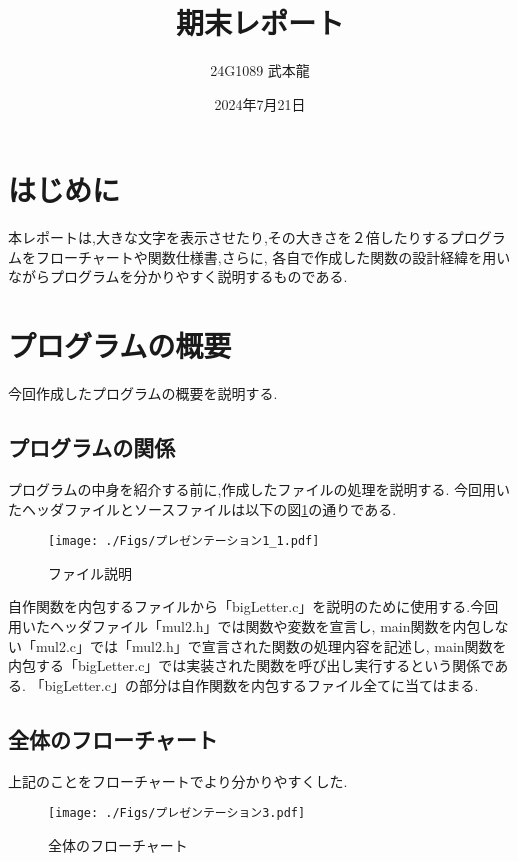 \documentclass[uplatex,dvipdfmx]{jsarticle}
\begin{document}
\title{期末レポート} %
\author{24G1089 武本龍}
\date{2024年7月21日}
\maketitle

\section{はじめに}
本レポートは,大きな文字を表示させたり,その大きさを２倍したりするプログラムをフローチャートや関数仕様書,さらに,
各自で作成した関数の設計経緯を用いながらプログラムを分かりやすく説明するものである.

\section{プログラムの概要}
今回作成したプログラムの概要を説明する.

\subsection{プログラムの関係}
プログラムの中身を紹介する前に,作成したファイルの処理を説明する.
今回用いたヘッダファイルとソースファイルは以下の図\ref{fig:ファイル説明}の通りである.

\begin{figure}[h]
    \centering
    \texttt{[image: ./Figs/プレゼンテーション1\_1.pdf]}
    \caption{ファイル説明}
    \label{fig:ファイル説明}
\end{figure}
 
自作関数を内包するファイルから「bigLetter.c」を説明のために使用する.今回用いたヘッダファイル「mul2.h」では関数や変数を宣言し,
main関数を内包しない「mul2.c」では「mul2.h」で宣言された関数の処理内容を記述し,
main関数を内包する「bigLetter.c」では実装された関数を呼び出し実行するという関係である.
「bigLetter.c」の部分は自作関数を内包するファイル全てに当てはまる.

\subsection{全体のフローチャート}
上記のことをフローチャートでより分かりやすくした.
\begin{figure}[h]
    \centering
    \texttt{[image: ./Figs/プレゼンテーション3.pdf]}
    \caption{全体のフローチャート}
    \label{fig:全体のフローチャート}
\end{figure}
\end{document}
